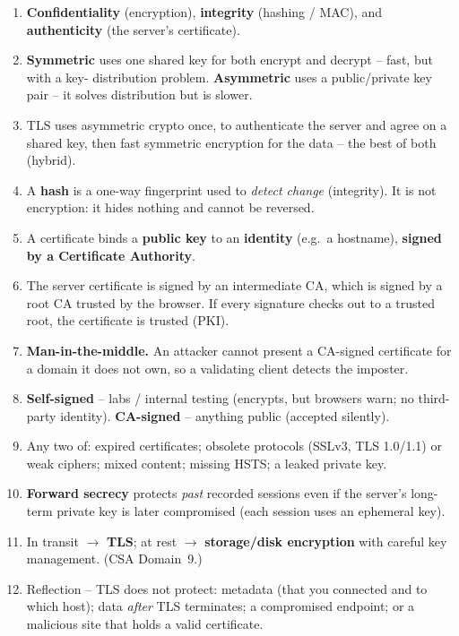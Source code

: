 \documentclass[11pt]{article}
\begin{document}
\begin{enumerate}
\item \textbf{Confidentiality} (encryption), \textbf{integrity} (hashing / MAC), and \textbf{authenticity}
      (the server's certificate).
\item \textbf{Symmetric} uses one shared key for both encrypt and decrypt -- fast, but with a key-
      distribution problem. \textbf{Asymmetric} uses a public/private key pair -- it solves distribution
      but is slower.
\item TLS uses asymmetric crypto once, to authenticate the server and agree on a shared key, then fast
      symmetric encryption for the data -- the best of both (hybrid).
\item A \textbf{hash} is a one-way fingerprint used to \emph{detect change} (integrity). It is not
      encryption: it hides nothing and cannot be reversed.
\item A certificate binds a \textbf{public key} to an \textbf{identity} (e.g.\ a hostname), \textbf{signed
      by a Certificate Authority}.
\item The server certificate is signed by an intermediate CA, which is signed by a root CA trusted by
      the browser. If every signature checks out to a trusted root, the certificate is trusted (PKI).
\item \textbf{Man-in-the-middle.} An attacker cannot present a CA-signed certificate for a domain it
      does not own, so a validating client detects the imposter.
\item \textbf{Self-signed} -- labs / internal testing (encrypts, but browsers warn; no third-party
      identity). \textbf{CA-signed} -- anything public (accepted silently).
\item Any two of: expired certificates; obsolete protocols (SSLv3, TLS 1.0/1.1) or weak ciphers; mixed
      content; missing HSTS; a leaked private key.
\item \textbf{Forward secrecy} protects \emph{past} recorded sessions even if the server's long-term
      private key is later compromised (each session uses an ephemeral key).
\item In transit $\rightarrow$ \textbf{TLS}; at rest $\rightarrow$ \textbf{storage/disk encryption} with
      careful key management. (CSA Domain~9.)
\item Reflection -- TLS does not protect: metadata (that you connected and to which host); data
      \emph{after} TLS terminates; a compromised endpoint; or a malicious site that holds a valid
      certificate.
\end{enumerate}
\end{document}

